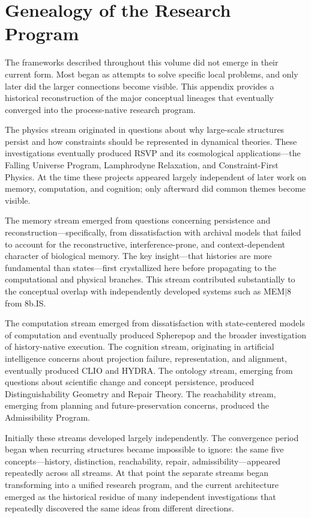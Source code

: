 \documentclass[11pt, oneside]{book}
\theoremstyle{definition}
\theoremstyle{remark}
\begin{document}
\chapter{Genealogy of the Research Program}

The frameworks described throughout this volume did not emerge in their current form. Most began as attempts to solve specific local problems, and only later did the larger connections become visible. This appendix provides a historical reconstruction of the major conceptual lineages that eventually converged into the process-native research program.

The physics stream originated in questions about why large-scale structures persist and how constraints should be represented in dynamical theories. These investigations eventually produced RSVP and its cosmological applications—the Falling Universe Program, Lamphrodyne Relaxation, and Constraint-First Physics. At the time these projects appeared largely independent of later work on memory, computation, and cognition; only afterward did common themes become visible.

The memory stream emerged from questions concerning persistence and reconstruction—specifically, from dissatisfaction with archival models that failed to account for the reconstructive, interference-prone, and context-dependent character of biological memory. The key insight—that histories are more fundamental than states—first crystallized here before propagating to the computational and physical branches. This stream contributed substantially to the conceptual overlap with independently developed systems such as MEM$|$8 from 8b.IS.

The computation stream emerged from dissatisfaction with state-centered models of computation and eventually produced Spherepop and the broader investigation of history-native execution. The cognition stream, originating in artificial intelligence concerns about projection failure, representation, and alignment, eventually produced CLIO and HYDRA. The ontology stream, emerging from questions about scientific change and concept persistence, produced Distinguishability Geometry and Repair Theory. The reachability stream, emerging from planning and future-preservation concerns, produced the Admissibility Program.

Initially these streams developed largely independently. The convergence period began when recurring structures became impossible to ignore: the same five concepts—history, distinction, reachability, repair, admissibility—appeared repeatedly across all streams. At that point the separate streams began transforming into a unified research program, and the current architecture emerged as the historical residue of many independent investigations that repeatedly discovered the same ideas from different directions.
\end{document}
